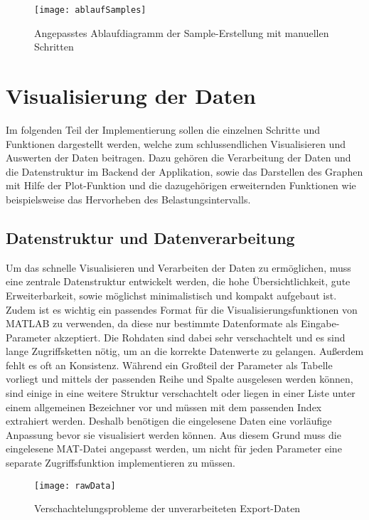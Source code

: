 \begin{figure}[H]
	\centering
	\texttt{[image: ablaufSamples]}
	\caption{Angepasstes Ablaufdiagramm der Sample-Erstellung mit manuellen Schritten}
	\label{fig:ablaufSamples}
\end{figure}

\section{Visualisierung der Daten}

Im folgenden Teil der Implementierung sollen die einzelnen Schritte und Funktionen dargestellt werden, welche zum schlussendlichen Visualisieren und Auswerten der Daten beitragen. Dazu gehören die Verarbeitung der Daten und die Datenstruktur im Backend der Applikation, sowie das Darstellen des Graphen mit Hilfe der Plot-Funktion und die dazugehörigen erweiternden Funktionen wie beispielsweise das Hervorheben des Belastungsintervalls.

\subsection{Datenstruktur und Datenverarbeitung}

Um das schnelle Visualisieren und Verarbeiten der Daten zu ermöglichen, muss eine zentrale Datenstruktur entwickelt werden, die hohe Übersichtlichkeit, gute Erweiterbarkeit, sowie möglichst minimalistisch und kompakt aufgebaut ist. Zudem ist es wichtig ein passendes Format für die Visualisierungsfunktionen von MATLAB zu verwenden, da diese nur bestimmte Datenformate als Eingabe-Parameter akzeptiert. Die Rohdaten sind dabei sehr verschachtelt und es sind lange Zugriffsketten nötig, um an die korrekte Datenwerte zu gelangen. Außerdem fehlt es oft an Konsistenz. Während ein Großteil der Parameter als Tabelle vorliegt und mittels der passenden Reihe und Spalte ausgelesen werden können, sind einige in eine weitere Struktur verschachtelt oder liegen in einer Liste unter einem allgemeinen Bezeichner vor und müssen mit dem passenden Index extrahiert werden. Deshalb benötigen die eingelesene Daten eine vorläufige Anpassung bevor sie visualisiert werden können. Aus diesem Grund muss die eingelesene MAT-Datei angepasst werden, um nicht für jeden Parameter eine separate Zugriffsfunktion implementieren zu müssen.

\begin{figure}[H]
	\centering
	\texttt{[image: rawData]}
	\caption{Verschachtelungsprobleme der unverarbeiteten Export-Daten}
	\label{fig:rawData}
\end{figure}

